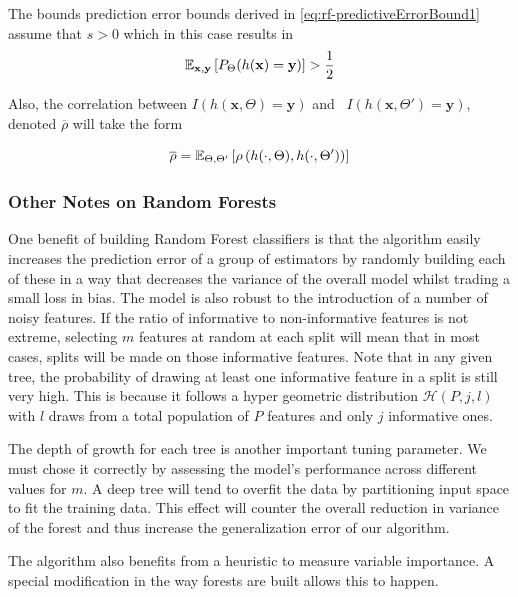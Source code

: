 The bounds prediction error bounds derived in \ref{eq:rf-predictiveErrorBound1} assume that $s >0$ which in this case results in
\begin{equation}
\operatorname{\mathbb{E}}_{\textbf{x},\textbf{y}} \left[ P_{\Theta}(h(\textbf{x}) = \textbf{y}) \right] > \frac{1}{2} 
\end{equation}


Also, the correlation between $I(h(\textbf{x}, \Theta) = \textbf{y})$ and \  $I(h(\textbf{x}, \Theta') = \textbf{y})$, denoted $\overline{\rho}$ will take the form

\begin{equation}
 \overline{\rho} =  \operatorname{\mathbb{E}}_{\Theta,\Theta'} \left[ \rho \left( h(\cdot{},\Theta) ,h(\cdot{},\Theta') \right)   \right] 
 \end{equation}

\subsubsection{Other Notes on Random Forests}
One benefit of building Random Forest classifiers is that the algorithm easily increases the prediction error of a group of estimators by randomly building each of these in a way that decreases the variance of the overall model whilst trading a small loss in bias. The model is also robust to the introduction of a number of noisy features. If the ratio of informative to non-informative features is not extreme, selecting $m$ features at random at each split will mean that in most cases, splits will be made on those informative features. Note that in any given tree, the probability of drawing at least one informative feature in a split is still very high. This is because it follows a hyper geometric distribution $\mathcal{H}(P,j,l)$ with $l$ draws from a total population of $P$ features and only $j$ informative ones.

The depth of growth for each tree is another important tuning parameter. We must chose it correctly by assessing the model's performance across different values for $m$.  A deep tree will tend to overfit the data by partitioning input space to fit the training data. This effect will counter the overall reduction in variance of the forest and thus increase the generalization error of our algorithm.


The algorithm also benefits from a heuristic to measure variable importance.
A special modification in the way forests are built allows this to happen.

